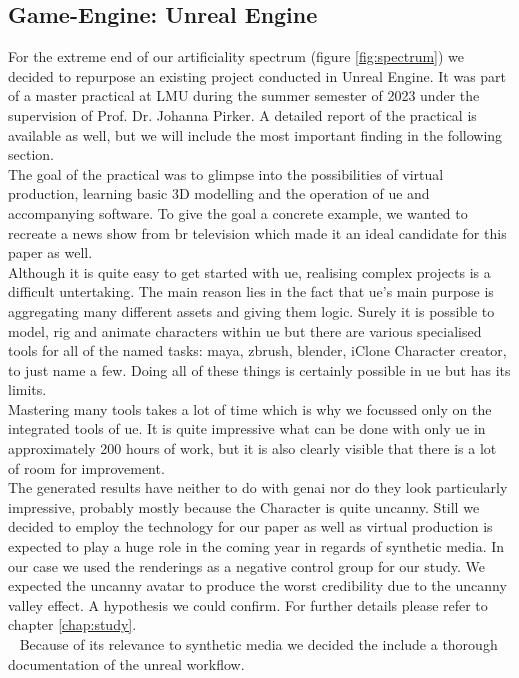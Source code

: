 \documentclass[
  a4paper,  %
  twoside,  %
  bibliography=totoc,
  headsepline,
  cleardoublepage=empty,
  parskip=half,
  draft=false
]{scrbook}
\begin{document}
\subsection{Game-Engine: Unreal Engine}
For the extreme end of our artificiality spectrum (figure \ref{fig:spectrum}) we decided to repurpose an existing project conducted in Unreal Engine. It was part of a master practical at LMU during the summer semester of 2023 under the supervision of Prof. Dr. Johanna Pirker. A detailed report of the practical is available as well, but we will include the most important finding in the following section. \\
The goal of the practical was to glimpse into the possibilities of virtual production, learning basic 3D modelling and the operation of \gls{ue} and accompanying software. To give the goal a concrete example, we wanted to recreate a news show from \gls{br} television which made it an ideal candidate for this paper as well. \\
Although it is quite easy to get started with \gls{ue}, realising complex projects is a difficult untertaking. The main reason lies in the fact that \gls{ue}'s main purpose is aggregating many different assets and giving them logic. Surely it is possible to model, rig and animate characters within \gls{ue} but there are various specialised tools for all of the named tasks: maya, zbrush, blender, iClone Character creator, to just name a few. Doing all of these things is certainly possible in \gls{ue} but has its limits. \\
Mastering many tools takes a lot of time which is why we focussed only on the integrated tools of \gls{ue}. It is quite impressive what can be done with only \gls{ue} in approximately 200 hours of work, but it is also clearly visible that there is a lot of room for improvement. \\
The generated results have neither to do with \gls{genai} nor do they look particularly impressive, probably mostly because the Character is quite uncanny. Still we decided to employ the technology for our paper as well as virtual production is expected to play a huge role in the coming year in regards of synthetic media. In our case we used the renderings as a negative control group for our study. We expected the uncanny avatar to produce the worst credibility due to the uncanny valley effect. A hypothesis we could confirm. For further details please refer to chapter \ref{chap:study}. \\ 
Because of its relevance to synthetic media we decided the include a thorough documentation of the unreal workflow.
\end{document}
